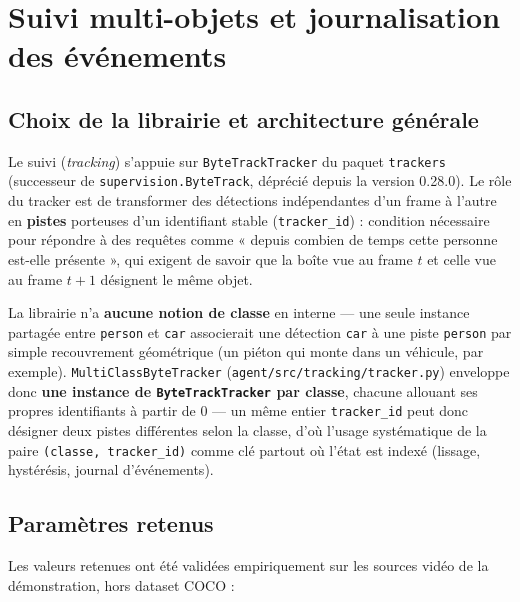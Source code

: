 \documentclass[11pt,a4paper]{article}
\let\Oldsubsection\subsection
\renewcommand{\subsection}{\FloatBarrier\Oldsubsection}
\begin{document}
    
    \section{Suivi multi-objets et journalisation des événements}
    
    \subsection{Choix de la librairie et architecture générale}
    
    Le suivi (\emph{tracking}) s'appuie sur \texttt{ByteTrackTracker} du
    paquet \texttt{trackers} (successeur de \texttt{supervision.ByteTrack},
    déprécié depuis la version 0.28.0). Le rôle du tracker est de
    transformer des détections indépendantes d'un frame à l'autre en
    \textbf{pistes} porteuses d'un identifiant stable (\texttt{tracker\_id}) :
    condition nécessaire pour répondre à des requêtes comme « depuis combien
    de temps cette personne est-elle présente », qui exigent de savoir que
    la boîte vue au frame $t$ et celle vue au frame $t+1$ désignent le même
    objet.
    
    La librairie n'a \textbf{aucune notion de classe} en interne --- une
    seule instance partagée entre \texttt{person} et \texttt{car}
    associerait une détection \texttt{car} à une piste \texttt{person} par
    simple recouvrement géométrique (un piéton qui monte dans un véhicule,
    par exemple). \texttt{MultiClassByteTracker} (\texttt{agent/src/tracking/tracker.py})
    enveloppe donc \textbf{une instance de \texttt{ByteTrackTracker} par
    classe}, chacune allouant ses propres identifiants à partir de 0 --- un
    même entier \texttt{tracker\_id} peut donc désigner deux pistes
    différentes selon la classe, d'où l'usage systématique de la paire
    \texttt{(classe, tracker\_id)} comme clé partout où l'état est indexé
    (lissage, hystérésis, journal d'événements).

    \subsection{Paramètres retenus}

    Les valeurs retenues ont été validées empiriquement sur les sources
    vidéo de la démonstration, hors dataset COCO :
    
\end{document}
